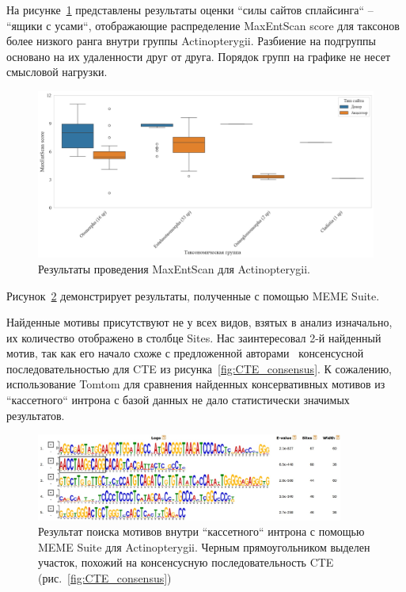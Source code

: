 На рисунке~\ref{fig:Actinopterygii_maxentscan} представлены результаты оценки ``силы сайтов сплайсинга`` – ``ящики с усами``, отображающие распределение MaxEntScan score для таксонов более низкого ранга внутри группы Actinopterygii.
Разбиение на подгруппы основано на их удаленности друг от друга.
Порядок групп на графике не несет смысловой нагрузки.

\begin{figure}[h] %
    \centering
    \includegraphics[width=1.0\textwidth]{images/Actinopterygii_maxentscan}
    \caption{Результаты проведения MaxEntScan для Actinopterygii.}
    \label{fig:Actinopterygii_maxentscan}
\end{figure}


Рисунок~\ref{fig:Actinopterygii_meme} демонстрирует результаты, полученные с помощью MEME Suite.

Найденные мотивы присутствуют не у всех видов, взятых в анализ изначально, их количество отображено в столбце Sites.
Нас заинтересовал 2-й найденный мотив, так как его начало схоже с предложенной авторами~\cite{cte_consensus} консенсусной последовательностью для CTE из рисунка~\ref{fig:CTE_consensus}.
К сожалению, использование Tomtom для сравнения найденных консервативных мотивов из ``кассетного`` интрона с базой данных не дало статистически значимых результатов.

\begin{figure}[h] %
    \centering
    \includegraphics[width=0.9\textwidth]{images/Actinopterygii_meme_motif}
    \caption{Результат поиска мотивов внутри ``кассетного`` интрона с помощью MEME Suite для Actinopterygii. Черным прямоугольником выделен участок, похожий на консенсусную последовательность CTE (рис.~\ref{fig:CTE_consensus})~\cite{cte_consensus}}
    \label{fig:Actinopterygii_meme}
\end{figure}

